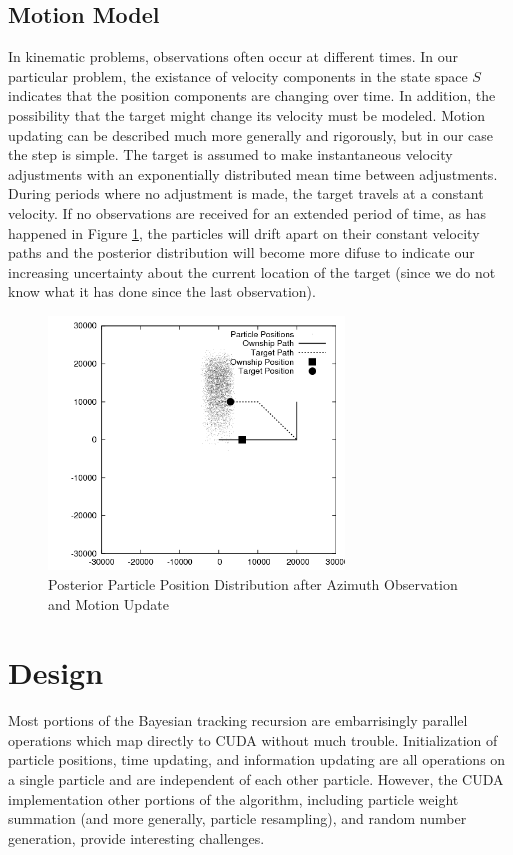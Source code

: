 \documentclass{article}
\begin{document}
\subsection{Motion Model}
In kinematic problems, observations often occur at different times. In our particular problem, the existance of velocity components in the state space \(S\) indicates that the position components are changing over time. In addition, the possibility that the target might change its velocity must be modeled. Motion updating can be described much more generally and rigorously, but in our case the step is simple. The target is assumed to make instantaneous velocity adjustments with an exponentially distributed mean time between adjustments. During periods where no adjustment is made, the target travels at a constant velocity. If no observations are received for an extended period of time, as has happened in Figure \ref{posterior2}, the particles will drift apart on their constant velocity paths and the posterior distribution will become more difuse to indicate our increasing uncertainty about the current location of the target (since we do not know what it has done since the last observation).

\begin{figure}
\centering
\includegraphics[width=0.7\textwidth]{data/particles_motion.png}
\caption{Posterior Particle Position Distribution after Azimuth Observation and Motion Update}
\label{posterior2}
\end{figure}

\section{Design}
Most portions of the Bayesian tracking recursion are embarrisingly parallel operations which map directly to CUDA without much trouble. Initialization of particle positions, time updating, and information updating are all operations on a single particle and are independent of each other particle. However, the CUDA implementation other portions of the algorithm, including particle weight summation (and more generally, particle resampling), and random number generation, provide interesting challenges.
\end{document}
